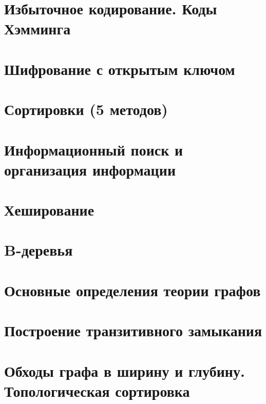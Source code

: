 \documentclass[12pt, fleqn]{article}
\begin{document}
\section{Избыточное кодирование. Коды Хэмминга}
\newpage

\section{Шифрование с открытым ключом}
\newpage

\section{Сортировки (5 методов)}
\newpage

\section{Информационный поиск и организация информации}
\newpage

\section{Хеширование}
\newpage



\section{B-деревья}
\newpage



\section{Основные определения теории графов}
\newpage

\section{Построение транзитивного замыкания}
\newpage

\section{Обходы графа в ширину и глубину. Топологическая сортировка}
\newpage
\end{document}
